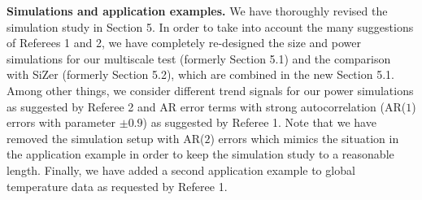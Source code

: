 \documentclass[a4paper,12pt]{article}
\begin{document}
\textbf{Simulations and application examples.} We have thoroughly revised the simulation study in Section 5. In order to take into account the many suggestions of Referees 1 and 2, we have completely re-designed the size and power simulations for our multiscale test (formerly Section 5.1) and the comparison with SiZer (formerly Section 5.2), which are combined in the new Section 5.1. Among other things, we consider different trend signals for our power simulations as suggested by Referee 2 and AR error terms with strong autocorrelation (AR($1$) errors with parameter $\pm 0.9$) as suggested by Referee 1. Note that we have removed the simulation setup with AR($2$) errors which mimics the situation in the application example in order to keep the simulation study to a reasonable length. Finally, we have added a second application example to global temperature data as requested by Referee 1. 





\end{document}
